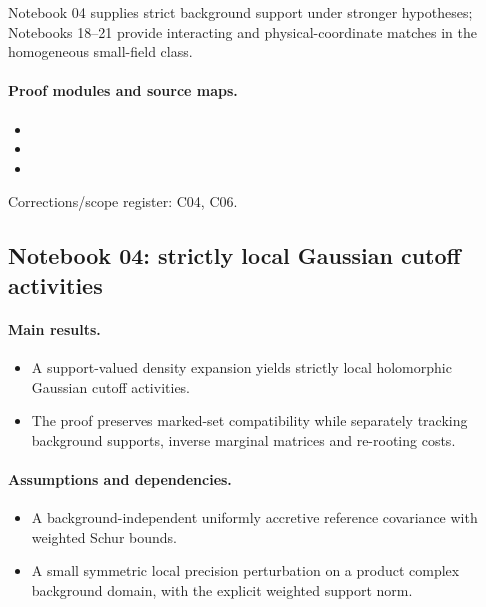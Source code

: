 Notebook 04 supplies strict background support under stronger hypotheses; Notebooks 18--21 provide interacting and physical-coordinate matches in the homogeneous small-field class.

\paragraph{Proof modules and source maps.}
\begingroup\small
\begin{itemize}
\item {}
\item {}
\item {}
\end{itemize}
\endgroup
Corrections/scope register: C04, C06.\par

\subsection{Notebook 04: strictly local Gaussian cutoff activities}
\label{hnc-04}
\noindent{}\par

\paragraph{Main results.}
\begin{itemize}
\item A support-valued density expansion yields strictly local holomorphic Gaussian cutoff activities.
\item The proof preserves marked-set compatibility while separately tracking background supports, inverse marginal matrices and re-rooting costs.
\end{itemize}

\paragraph{Assumptions and dependencies.}
\begin{itemize}
\item A background-independent uniformly accretive reference covariance with weighted Schur bounds.
\item A small symmetric local precision perturbation on a product complex background domain, with the explicit weighted support norm.
\end{itemize}

